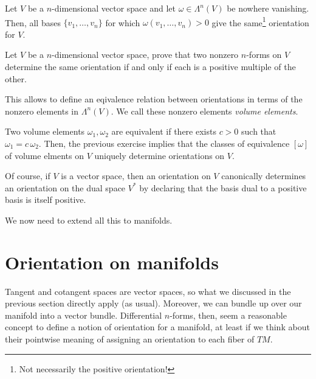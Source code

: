 \begin{lemma}\label{lemma:orient}
  Let $V$ be a $n$-dimensional vector space and let $ \omega\in\Lambda^n(V)$ be nowhere vanishing.
  Then, all bases $\{v_1, \ldots, v_n\}$ for which $\omega(v_1,\ldots, v_n) > 0$ give the same\footnote{Not necessarily the positive orientation!} orientation for $V$.
\end{lemma}

\begin{exercise}
  Let $V$ be a $n$-dimensional vector space, prove that two nonzero $n$-forms on $V$ determine the same orientation if and only if each is a positive multiple of the other.
\end{exercise}

This allows to define an eqivalence relation between orientations in terms of the nonzero elements in $\Lambda^n(V)$. We call these nonzero elements \emph{volume elements}.

Two volume elements $\omega_1, \omega_2$ are equivalent if there exists $c > 0$ such that $\omega_1 = c\, \omega_2$.
Then, the previous exercise implies that the classes of equivalence $[\omega]$ of volume elments on $V$ uniquely determine orientations on $V$.

\begin{remark}
  Of course, if $V$ is a vector space, then an orientation on $V$ canonically determines an orientation on the dual space $V^*$ by declaring that the basis dual to a positive basis is itself positive.
\end{remark}

We now need to extend all this to manifolds.

\section{Orientation on manifolds}
Tangent and cotangent spaces are vector spaces, so what we discussed in the previous section directly apply (as usual).
Moreover, we can bundle up over our manifold into a vector bundle.
Differential $n$-forms, then, seem a reasonable concept to define a notion of orientation for a manifold, at least if we think about their pointwise meaning of assigning an orientation to each fiber of $TM$.

